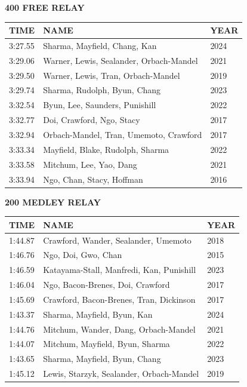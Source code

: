\begin{table}[H]
\centering
\begin{minipage}[t]{0.6\textwidth}
\centering
\textbf{400 FREE RELAY}\\[0.1cm]
\begin{tabular}{@{}p{1.8cm}p{2.8cm}p{1.2cm}@{}}
\hline
    \textbf{TIME} & \textbf{NAME} & \textbf{YEAR} \\
\hline
    3:27.55 & Sharma, Mayfield, Chang, Kan & 2024 \\
    3:29.06 & Warner, Lewis, Sealander, Orbach-Mandel & 2021 \\
    3:29.50 & Warner, Lewis, Tran, Orbach-Mandel & 2019 \\
    3:29.74 & Sharma, Rudolph, Byun, Chang & 2023 \\
    3:32.54 & Byun, Lee, Saunders, Punishill & 2022 \\
    3:32.77 & Doi, Crawford, Ngo, Stacy & 2017 \\
    3:32.94 & Orbach-Mandel, Tran, Umemoto, Crawford & 2017 \\
    3:33.34 & Mayfield, Blake, Rudolph, Sharma & 2022 \\
    3:33.58 & Mitchum, Lee, Yao, Dang & 2021 \\
    3:33.94 & Ngo, Chan, Stacy, Hoffman & 2016 \\
\hline
\end{tabular}
\end{minipage}
\end{table}

\begin{table}[H]
\centering
\begin{minipage}[t]{0.6\textwidth}
\centering
\textbf{200 MEDLEY RELAY}\\[0.1cm]
\begin{tabular}{@{}p{1.8cm}p{2.8cm}p{1.2cm}@{}}
\hline
    \textbf{TIME} & \textbf{NAME} & \textbf{YEAR} \\
\hline
    1:44.87 & Crawford, Wander, Sealander, Umemoto & 2018 \\
    1:46.76 & Ngo, Doi, Gwo, Chan & 2015 \\
    1:46.59 & Katayama-Stall, Manfredi, Kan, Punishill & 2023 \\
    1:46.04 & Ngo, Bacon-Brenes, Doi, Crawford & 2017 \\
    1:45.69 & Crawford, Bacon-Brenes, Tran, Dickinson & 2017 \\
    1:43.37 & Sharma, Mayfield, Byun, Kan & 2024 \\
    1:44.76 & Mitchum, Wander, Dang, Orbach-Mandel & 2021 \\
    1:44.07 & Mitchum, Mayfield, Byun, Sharma & 2022 \\
    1:43.65 & Sharma, Mayfield, Byun, Chang & 2023 \\
    1:45.12 & Lewis, Starzyk, Sealander, Orbach-Mandel & 2019 \\
\hline
\end{tabular}
\end{minipage}
\end{table}

